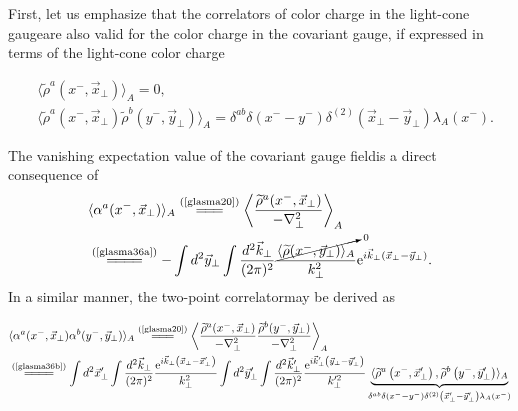 \begin{note}
    First, let us emphasize that the correlators of color charge in the light-cone gaugeare also valid for the color charge in the covariant gauge, if expressed in terms of the light-cone color charge
    \begin{fullwidth}
    \begin{subequations}
    \begin{align}
        &\langle \widetilde{\rho}^a\left(x^-,\vec{x}_\perp\right)\rangle_A=0,\label{glasma36a}\\
        &\langle \widetilde{\rho}^a\left(x^-,\vec{x}_\perp\right)\widetilde{\rho}^b\left(y^-,\vec{y}_\perp\right)\rangle_A=\delta^{ab}\delta\left(x^--y^-\right)\delta^{(2)}\left(\vec{x}_\perp-\vec{y}_\perp\right)\lambda_A(x^-).\label{glasma36b}
    \end{align}
    \end{subequations}
    \end{fullwidth}
    The vanishing expectation value of the covariant gauge fieldis a direct consequence of
    \begin{align*}
        &\langle \alpha^a(x^-,\vec{x}_\perp)\rangle_A\stackrel{(\text{\cref{glasma20}})}{=\joinrel=\joinrel=}\left\langle\frac{\widetilde{\rho}^a(x^-,\vec{x}_\perp)}{-\nabla_\perp^2}\right\rangle_A\\
        &\stackrel{(\text{\cref{glasma36a}})}{=\joinrel=\joinrel=\joinrel=}-\int d^2\vec{y}_\perp\int \frac{d^2\vec{k}_\perp}{(2\pi)^2}\frac{\cancelto{0}{\langle\widetilde{\rho}(x^-,\vec{y}_\perp)\rangle_A}}{k_\perp^2}\mathrm{e}^{i\vec{k}_\perp\left(\vec{x}_\perp-\vec{y}_\perp\right)}.
    \end{align*}
    In a similar manner, the two-point correlatormay be derived as
    \begin{fullwidth}
    \begin{align*}
        &\langle \alpha^a(x^-,\vec{x}_\perp)\alpha^b(y^-,\vec{y}_\perp)\rangle_A\stackrel{(\text{\cref{glasma20}})}{=\joinrel=\joinrel=}\left\langle\frac{\widetilde{\rho}^a(x^-,\vec{x}_\perp)}{-\nabla_\perp^2}\frac{\widetilde{\rho}^b(y^-,\vec{y}_\perp)}{-\nabla_\perp^2}\right\rangle_A\\
        &\stackrel{(\text{\cref{glasma36b}})}{=\joinrel=\joinrel=\joinrel=}\int d^2\vec{x}^\prime_\perp\int \frac{d^2\vec{k}_\perp}{(2\pi)^2}\frac{\mathrm{e}^{i\vec{k}_\perp\left(\vec{x}_\perp-\vec{x}^\prime_\perp\right)}}{k_\perp^2}\int d^2\vec{y}^\prime_\perp\int \frac{d^2\vec{k}^\prime_\perp}{(2\pi)^2}\frac{\mathrm{e}^{i\vec{k}^\prime_\perp\left(\vec{y}_\perp-\vec{y}^\prime_\perp\right)}}{k^{\prime 2}_\perp}\underbrace{\langle \widetilde{\rho}^a\left(x^-,\vec{x}^\prime_\perp\right),\widetilde{\rho}^b\left(y^-,\vec{y}^\prime_\perp\right)\rangle_A}_{\delta^{ab}\delta\left(x^--y^-\right)\delta^{(2)}\left(\vec{x}^\prime_\perp-\vec{y}^\prime_\perp\right)\lambda_A(x^-)}\\

\end{align*}
\end{fullwidth}
\end{note}
